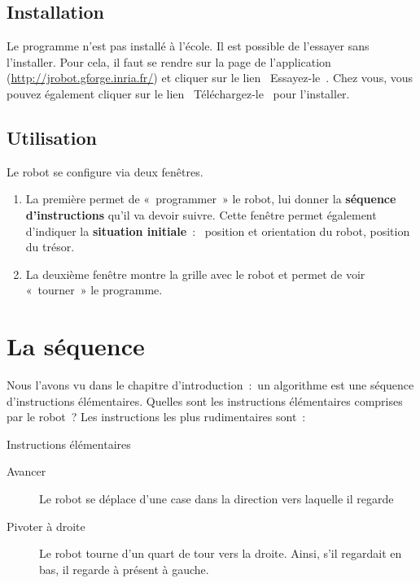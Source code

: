 	\subsection{Installation}

		Le programme n’est pas installé à l’école.
		Il est possible de l’essayer sans l’installer.
		Pour cela, il faut se rendre sur la page de l’application
		(\url{http://jrobot.gforge.inria.fr/}) et cliquer sur le lien
		\og~Essayez-le~\fg.
		Chez vous, vous pouvez également cliquer sur le lien 
		\og~Téléchargez-le~\fg{} pour l’installer.
		
	\subsection{Utilisation}

		Le robot se configure via deux fenêtres.

		\begin{enumerate}
		\item 
			La première permet de «~programmer~» le robot, 
			lui donner la \textbf{séquence d’instructions}
			qu’il va devoir suivre. 
			Cette fenêtre permet également
			d’indiquer la \textbf{situation initiale}~:~
			position et orientation du robot, position du trésor.
			
		\item 
			La deuxième fenêtre montre la grille avec le robot 
			et permet de voir «~tourner~» le programme.  
		\end{enumerate}

\section{La séquence}

	Nous l’avons vu dans le chapitre
	d’introduction~:~un algorithme est une séquence
	d’instructions élémentaires. Quelles sont les
	instructions élémentaires comprises par le robot~? Les instructions les
	plus rudimentaires sont~:
	
	\begin{Emphase}[definition]{Instructions élémentaires}
		\remonter
		\begin{description}
		\item[Avancer]
			Le robot se déplace d’une case dans la direction vers laquelle il regarde
		\item[Pivoter à droite]
			Le robot tourne d’un quart de tour vers la droite.
			Ainsi, s’il regardait en bas, il regarde à présent à gauche.
		\end{description}
	\end{Emphase}
		
